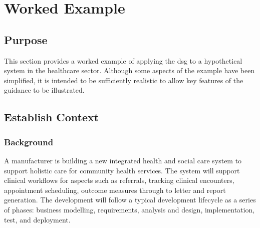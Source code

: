 %
%
\chapter{Worked Example} \label{bkm:workedexample}


\section{Purpose}
This section provides a worked example of applying the \gls{dsg} to a hypothetical system in the healthcare sector. Although some aspects of the example have been simplified, it is intended to be sufficiently realistic to allow key features of the guidance to be illustrated.

\section{Establish Context}

\subsection{Background}
A manufacturer is building a new integrated health and social care system to support holistic care for community health services. The system will support clinical workflows for aspects such as referrals, tracking clinical encounters, appointment scheduling, outcome measures through to letter and report generation. The development will follow a typical development lifecycle as a series of phases: business modelling, requirements, analysis and design, implementation, test, and deployment. 

